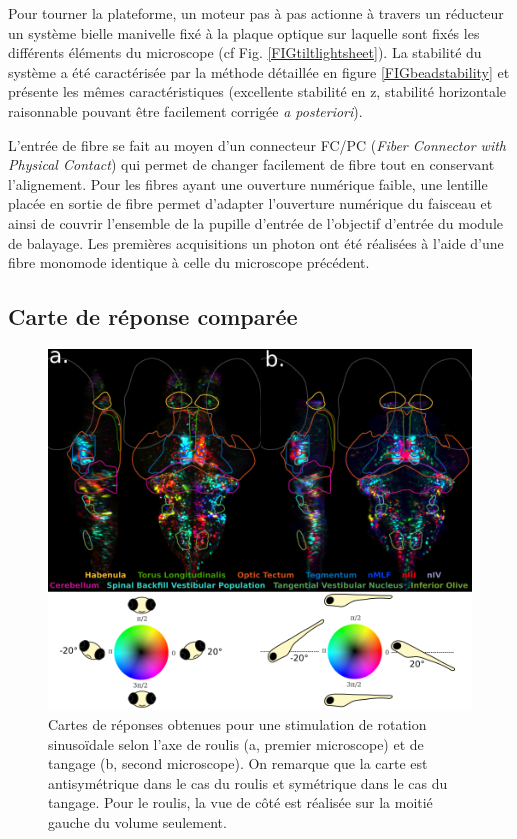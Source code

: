 Pour tourner la plateforme, un moteur pas à pas actionne à travers un réducteur un système bielle manivelle fixé à la plaque optique sur laquelle sont fixés les différents éléments du microscope (cf Fig. \ref{FIGtiltlightsheet}). La stabilité du système a été caractérisée par la méthode détaillée en figure \ref{FIGbeadstability} et présente les mêmes caractéristiques (excellente stabilité en z, stabilité horizontale raisonnable pouvant être facilement corrigée \emph{a posteriori}).

L'entrée de fibre se fait au moyen d'un connecteur FC/PC (\emph{Fiber Connector with Physical Contact}) qui permet de changer facilement de fibre tout en conservant l'alignement. Pour les fibres ayant une ouverture numérique faible, une lentille placée en sortie de fibre permet d'adapter l'ouverture numérique du faisceau et ainsi de couvrir l'ensemble de la pupille d'entrée de l'objectif d'entrée du module de balayage. Les premières acquisitions un photon ont été réalisées à l'aide d'une fibre monomode identique à celle du microscope précédent.

\subsection{Carte de réponse comparée}

\begin{figure}
\centering
\includegraphics[width=\textwidth]{./files/tilt_roll.svg.png}
\caption{Cartes de réponses obtenues pour une stimulation de rotation sinusoïdale selon l'axe de roulis (a, premier microscope) et de tangage (b, second microscope). On remarque que la carte est antisymétrique dans le cas du roulis et symétrique dans le cas du tangage.
Pour le roulis, la vue de côté est réalisée sur la moitié gauche du volume seulement.
\label{FIGtiltroll}}
\end{figure}

